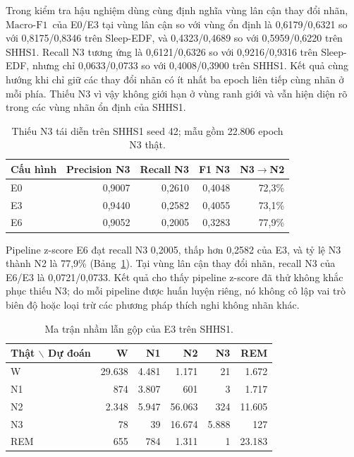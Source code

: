 \documentclass[10pt,a4paper]{article}
\newcommand{\mf}{\ensuremath{\mathrm{Macro\mbox{-}F1}}}
\begin{document}
Trong kiểm tra hậu nghiệm dùng cùng định nghĩa vùng lân cận thay đổi nhãn, \mf\ của E0/E3 tại vùng lân cận so với vùng ổn định là 0,6179/0,6321 so với 0,8175/0,8346 trên Sleep-EDF, và 0,4323/0,4689 so với 0,5959/0,6220 trên SHHS1. Recall N3 tương ứng là 0,6121/0,6326 so với 0,9216/0,9316 trên Sleep-EDF, nhưng chỉ 0,0633/0,0733 so với 0,4008/0,3900 trên SHHS1. Kết quả cùng hướng khi chỉ giữ các thay đổi nhãn có ít nhất ba epoch liên tiếp cùng nhãn ở mỗi phía. Thiếu N3 vì vậy không giới hạn ở vùng ranh giới và vẫn hiện diện rõ trong các vùng nhãn ổn định của SHHS1.

\begin{table}[t]
\centering
\caption{Thiếu N3 tái diễn trên SHHS1 seed 42; mẫu gồm 22.806 epoch N3 thật.}
\label{tab:shhs-n3-shared}
\small
\begin{tabular}{lrrrr}
\toprule
\textbf{Cấu hình} & \textbf{Precision N3} & \textbf{Recall N3} & \textbf{F1 N3} & \textbf{N3$\rightarrow$N2} \\
\midrule
E0 & 0,9007 & 0,2610 & 0,4048 & 72,3\% \\
E3 & 0,9440 & 0,2582 & 0,4055 & 73,1\% \\
E6 & 0,9052 & 0,2005 & 0,3283 & 77,9\% \\
\bottomrule
\end{tabular}
\end{table}

Pipeline z-score E6 đạt recall N3 0,2005, thấp hơn 0,2582 của E3, và tỷ lệ N3 thành N2 là 77,9\% (Bảng~\ref{tab:shhs-n3-shared}). Tại vùng lân cận thay đổi nhãn, recall N3 của E6/E3 là 0,0721/0,0733. Kết quả cho thấy pipeline z-score đã thử không khắc phục thiếu N3; do mỗi pipeline được huấn luyện riêng, nó không cô lập vai trò biên độ hoặc loại trừ các phương pháp thích nghi không nhãn khác.

\begin{table}[t]
\centering
\caption{Ma trận nhầm lẫn gộp của E3 trên SHHS1.}
\label{tab:shhs-confusion}
\scriptsize
\begin{tabular}{lrrrrr}
\toprule
\textbf{Thật $\backslash$ Dự đoán} & \textbf{W} & \textbf{N1} & \textbf{N2} & \textbf{N3} & \textbf{REM} \\
\midrule
W & 29.638 & 4.481 & 1.171 & 21 & 1.672 \\
N1 & 874 & 3.807 & 601 & 3 & 1.717 \\
N2 & 2.348 & 5.947 & 56.063 & 324 & 11.605 \\
N3 & 78 & 39 & 16.674 & 5.888 & 127 \\
REM & 655 & 784 & 1.311 & 1 & 23.183 \\
\bottomrule
\end{tabular}
\end{table}
\end{document}
